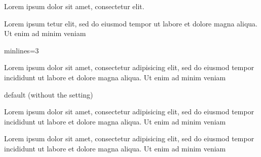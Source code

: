 \documentclass{article}
\begin{document}
Lorem ipsum dolor sit amet, consectetur  elit.

Lorem ipsum tetur 
elit, sed do eiusmod tempor  ut labore et dolore magna
aliqua. Ut enim ad minim veniam

\begin{clozepar}[minlines=3]
minlines=3
\end{clozepar}

Lorem ipsum dolor sit amet, consectetur adipisicing elit, sed do eiusmod
tempor incididunt ut labore et dolore magna aliqua. Ut enim ad minim
veniam

\begin{clozepar}
default (without the setting)
\end{clozepar}

Lorem ipsum dolor sit amet, consectetur adipisicing elit, sed do eiusmod
tempor incididunt ut labore et dolore magna aliqua. Ut enim ad minim
veniam

\begin{clozepar}[minlines=7]
Lorem ipsum dolor sit amet, consectetur adipisicing elit, sed do eiusmod
tempor incididunt ut labore et dolore magna aliqua. Ut enim ad minim
veniam
\end{clozepar}
\end{document}
